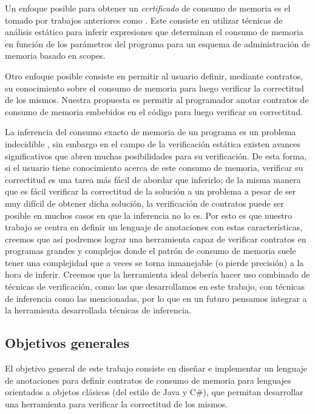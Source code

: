 \documentclass[12pt,a4paper]{article}
\begin{document}
			Un enfoque posible para obtener un \textit{certificado} de consumo de memoria es el tomado por trabajos anteriores como \cite{Rou09}. Este consiste en utilizar técnicas de análisis estático para inferir expresiones que determinan el consumo de memoria en función de los parámetros del programa para un esquema de administración de memoria basado en scopes.

			Otro enfoque posible consiste en permitir al usuario definir, mediante contratos, su conocimiento sobre el consumo de memoria para luego verificar la correctitud de los mismos. Nuestra propuesta es permitir al programador anotar contratos de consumo de memoria embebidos en el código para luego verificar su correctitud.

			La inferencia del consumo exacto de memoria de un programa es un problema indecidible \cite{Gheorghioiu02staticallydetermining}, sin embargo en el campo de la verificación estática existen avances significativos que abren muchas posibilidades para su verificación. De esta forma, si el usuario tiene conocimiento acerca de este consumo de memoria, verificar su correctitud es una tarea más fácil de abordar que inferirlo; de la misma manera que es fácil verificar la correctitud de la solución a un problema a pesar de ser muy difícil de obtener dicha solución, la verificación de contratos puede ser posible en muchos casos en que la inferencia no lo es. Por esto es que nuestro trabajo se centra en definir un lenguaje de anotaciones con estas características, creemos que así podremos lograr una herramienta capaz de verificar contratos en programas grandes y complejos donde el patrón de consumo de memoria suele tener una complejidad que a veces se torna inmanejable (o pierde precisión) a la hora de inferir. Creemos que la herramienta ideal debería hacer uso combinado de técnicas de verificación, como las que desarrollamos en este trabajo, con técnicas de inferencia como las mencionadas, por lo que en un futuro pensamos integrar a la herramienta desarrollada técnicas de inferencia.
		\subsection{Objetivos generales}
			El objetivo general de este trabajo consiste en diseñar e implementar un lenguaje de anotaciones para definir contratos de consumo de memoria para lenguajes orientados a objetos clásicos (del estilo de Java y C\#), que permitan desarrollar una herramienta para verificar la correctitud de los mismos.
			
\end{document}
